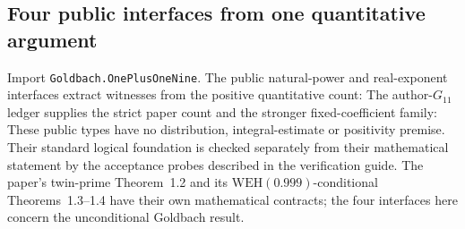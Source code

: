\subsection{Four public interfaces from one quantitative argument}
Import \texttt{Goldbach.OnePlusOneNine}. The public natural-power and
real-exponent interfaces extract witnesses from the positive quantitative count:
The author-$G_{11}$ ledger supplies the strict paper count and the stronger
fixed-coefficient family:
These public types have no distribution, integral-estimate or positivity
premise. Their standard logical foundation is checked separately from their
mathematical statement by the acceptance probes described in the verification
guide. The paper's twin-prime Theorem~1.2 and its
$\mathrm{WEH}(0.999)$-conditional Theorems~1.3--1.4 have their own mathematical
contracts; the four interfaces here concern the unconditional Goldbach result.
